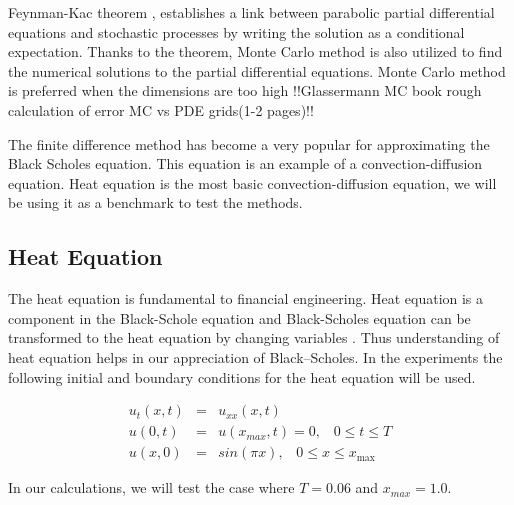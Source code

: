 \documentclass[12pt, oneside]{book}
\theoremstyle{plain}
\theoremstyle{definition}
\begin{document}
Feynman-Kac theorem \cite{klebaner}, establishes a link between parabolic partial differential equations and stochastic processes by writing the solution as a conditional expectation. Thanks to the theorem, Monte Carlo method is also utilized to find the numerical solutions to the partial differential equations.  Monte Carlo method is preferred when the dimensions are too high !!Glassermann MC book rough calculation of error MC vs PDE grids(1-2 pages)!!

The finite difference method has become a very popular for approximating the Black Scholes equation. This equation is an example of a convection-diffusion equation. Heat equation is the most basic convection-diffusion equation, we will be using it as a benchmark to test the methods. 

\subsection{Heat Equation}
The heat equation is fundamental to financial engineering. Heat equation is a component in the Black-Schole equation and Black-Scholes equation can be transformed to the heat equation by changing variables \cite{capinski}. Thus understanding  of  heat equation  helps  in  our appreciation of Black–Scholes. In the experiments the following initial and boundary conditions for the heat equation will be used.


\begin{eqnarray} \label{HeatBase}
u_t(x,t) &=& u_{xx}(x, t) \\[10pt]
u(0, t) &=& u(x_{max}, t) = 0, \hspace{10pt} 0 \leq t \leq T \\[10pt]
u(x, 0) &=& sin(\pi x), \hspace{10pt} 0 \leq x \leq x_{\max}
\end{eqnarray}

In our calculations, we will test the case where $T = 0.06$ and $x_{max} = 1.0$.
\end{document}
